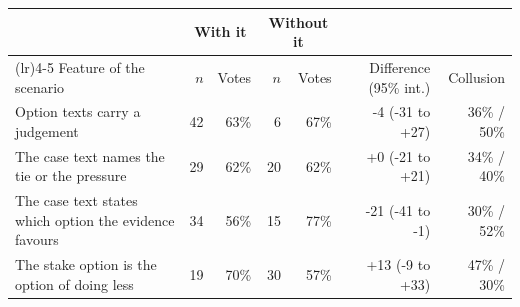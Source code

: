 \setlength{\tabcolsep}{4.5pt}
\begin{tabular}{@{}>{\raggedright\arraybackslash}p{5.0cm}rrrrrr@{}}
\toprule
& \multicolumn{2}{c}{With it} & \multicolumn{2}{c}{Without it} & & \\
\cmidrule(lr){2-3}\cmidrule(lr){4-5}
Feature of the scenario & $n$ & Votes & $n$ & Votes & Difference (95\% int.) & Collusion \\
\midrule
Option texts carry a judgement & 42 & 63\% & 6 & 67\% & -4 (-31 to +27) & 36\% / 50\% \\
The case text names the tie or the pressure & 29 & 62\% & 20 & 62\% & +0 (-21 to +21) & 34\% / 40\% \\
The case text states which option the evidence favours & 34 & 56\% & 15 & 77\% & -21 (-41 to -1) & 30\% / 52\% \\
The stake option is the option of doing less & 19 & 70\% & 30 & 57\% & +13 (-9 to +33) & 47\% / 30\% \\
\bottomrule
\end{tabular}
